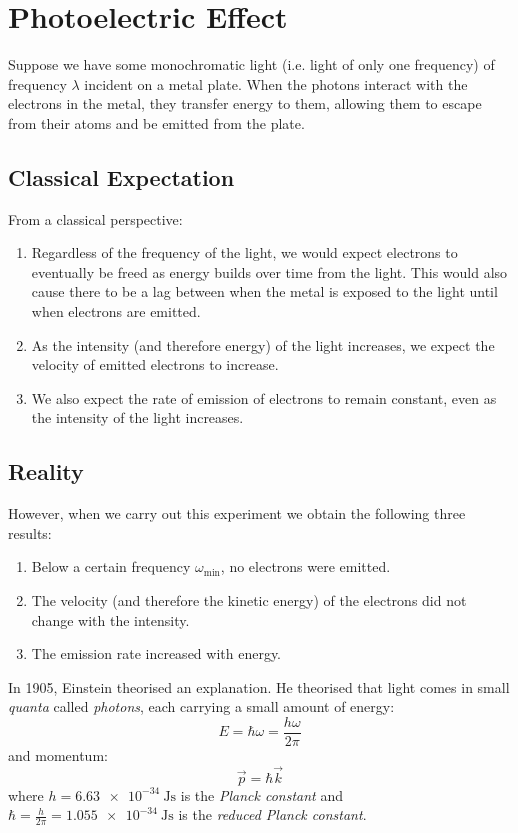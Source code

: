 \documentclass[../main.tex]{subfiles}
\begin{document}
\section{Photoelectric Effect}
Suppose we have some monochromatic light (i.e. light of only one frequency) of frequency $\lambda$ incident on a metal plate.
When the photons interact with the electrons in the metal, they transfer energy to them, allowing them to escape from their atoms and be emitted from the plate.

\subsection{Classical Expectation}
From a classical perspective:
\begin{enumerate}
  \item Regardless of the frequency of the light, we would expect electrons to eventually be freed as energy builds over time from the light. This would also cause there to be a lag between when the metal is exposed to the light until when electrons are emitted.
  \item As the intensity (and therefore energy) of the light increases, we expect the velocity of emitted electrons to increase.
  \item We also expect the rate of emission of electrons to remain constant, even as the intensity of the light increases.
\end{enumerate}
\subsection{Reality}
However, when we carry out this experiment we obtain the following three results:
\begin{enumerate}
  \item Below a certain frequency $\omega_{\text{min}}$, no electrons were emitted.
  \item The velocity (and therefore the kinetic energy) of the electrons did not change with the intensity.
  \item The emission rate increased with energy.
\end{enumerate}
In 1905, Einstein theorised an explanation.
He theorised that light comes in small \textit{quanta} called \textit{photons}, each carrying a small amount of energy:
\[
  E = \hbar \omega = \frac{h \omega}{2\pi}
\]
and momentum:
\[
  \vec{p} = \hbar \vec{k}
\]
where $h = \qty{6.63e-34}{\joule\second}$ is the \textit{Planck constant} and $\hbar = \frac{h}{2\pi} = \qty{1.055e-34}{\joule\second}$ is the \textit{reduced Planck constant}.
\end{document}
